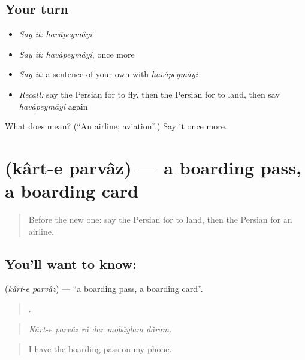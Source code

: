 \subsection*{Your turn}
\begin{itemize}
\raggedright
  \item \emph{Say it:} \emph{havâpeymâyi}
  \item \emph{Say it:} \emph{havâpeymâyi}, once more
  \item \emph{Say it:} a sentence of your own with \emph{havâpeymâyi}
  \item \emph{Recall:} say the Persian for to fly, then the Persian for to land, then say \emph{havâpeymâyi} again
\end{itemize}

\begin{tcolorbox}[breakable,colback=teal!4,colframe=teal!35!black,title={Before you move on}]
What does  mean? (\textquotedblleft{}An airline; aviation\textquotedblright{}.) Say it once more.
\end{tcolorbox}
\section[\texorpdfstring{\fa{کارت} \fa{پرواز} (kârt-e parvâz)}{کارت پرواز (kârt-e parvâz)}]{  (kârt-e parvâz) — a boarding pass, a boarding card}

\label{lesson:FA-C431-kart-e-parvaz}



\begin{quote}
Before the new one: say the Persian for to land, then the Persian for an airline.
\end{quote}

\subsection*{You'll want to know:  }
\textbf{ } (\emph{kârt-e parvâz}) — \textquotedblleft{}a boarding pass, a boarding card\textquotedblright{}.

\begin{quote}
     .
\end{quote}

\begin{quote}
\emph{Kârt-e parvâz râ dar mobâylam dâram.}
\end{quote}

\begin{quote}
I have the boarding pass on my phone.
\end{quote}


